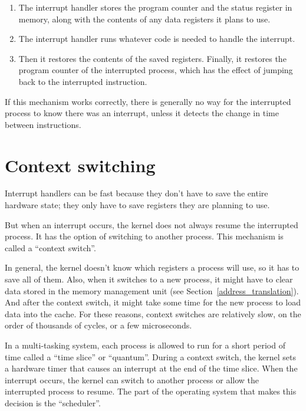 \documentclass[12pt]{book}
\begin{document}
{\begin{enumerate}
\item The interrupt handler stores the program counter and the
status register in memory, along with the contents of any data
registers it plans to use.

\item The interrupt handler runs whatever code is needed to handle
the interrupt.

\item Then it restores the contents of the saved registers.  Finally,
it restores the program counter of the interrupted process, which
has the effect of jumping back to the interrupted instruction.

\end{enumerate}

If this mechanism works correctly, there is generally no way for
the interrupted process to know there was an interrupt, unless
it detects the change in time between instructions.


\section{Context switching}

Interrupt handlers can be fast because they don't have to save the
entire hardware state; they only have to save registers they are
planning to use.

But when an interrupt occurs, the kernel does not always resume the
interrupted process.  It has the option of switching to another
process.  This mechanism is called a ``context switch''.

In general, the kernel doesn't know which registers a process will
use, so it has to save all of them.  Also, when it switches to a new
process, it might have to clear data stored in the memory management
unit (see
Section~\ref{address_translation}).  And after the context switch, it
might take some time for the new process to load data into the cache.
For these reasons, context switches are relatively slow, on the order
of thousands of cycles, or a few microseconds.

In a multi-tasking system, each process is allowed to run for a short
period of time called a ``time slice'' or ``quantum''.  During
a context switch, the kernel sets a hardware timer that causes
an interrupt at the end of the time slice.  When the interrupt
occurs, the kernel can switch to another process or allow the
interrupted process to resume.  The part of the operating system
that makes this decision is the ``scheduler''.


}
\end{document}
